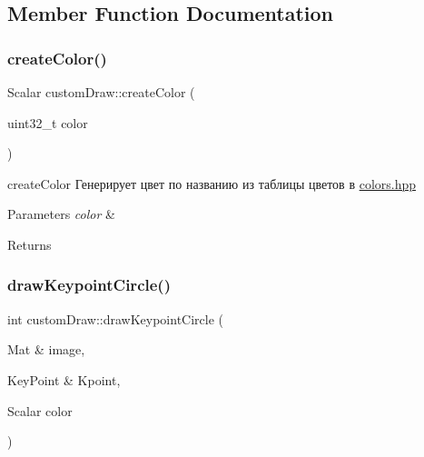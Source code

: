 \subsection{Member Function Documentation}
\mbox{\label{classcustom_draw_a9b316ec0c5b586ab78d734c121e584c5}} 
\subsubsection{\texorpdfstring{create\+Color()}{createColor()}}
{\footnotesize\ttfamily Scalar custom\+Draw\+::create\+Color (\begin{DoxyParamCaption}\item[{uint32\+\_\+t}]{color }\end{DoxyParamCaption})\hspace{0.3cm}{\ttfamily [static]}}



create\+Color Генерирует цвет по названию из таблицы цветов в \hyperlink{colors_8hpp_source}{colors.\+hpp} 


\begin{DoxyParams}{Parameters}
{\em color} & \\
\hline
\end{DoxyParams}
\begin{DoxyReturn}{Returns}

\end{DoxyReturn}
\mbox{\label{classcustom_draw_aced241b508544a5dea840f97fe1f2e2c}} 
\subsubsection{\texorpdfstring{draw\+Keypoint\+Circle()}{drawKeypointCircle()}}
{\footnotesize\ttfamily int custom\+Draw\+::draw\+Keypoint\+Circle (\begin{DoxyParamCaption}\item[{Mat \&}]{image,  }\item[{Key\+Point \&}]{Kpoint,  }\item[{Scalar}]{color }\end{DoxyParamCaption})\hspace{0.3cm}{\ttfamily [static]}}




